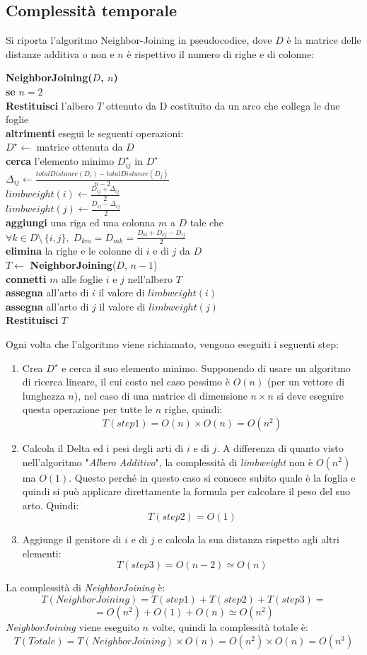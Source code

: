 \newpage
\subsection{Complessità temporale}
Si riporta l'algoritmo Neighbor-Joining in pseudocodice, dove $D$ è la matrice delle distanze additiva o non e $n$ è rispettivo il numero di righe e di colonne:
\begin{framed}\noindent
  \textbf{NeighborJoining($D$, $n$)}\\
  \textbf{se} $n=2$\\
  \indent \textbf{Restituisci} l'albero $T$ ottenuto da D costituito da un arco che collega le due foglie\\
  \textbf{altrimenti} esegui le seguenti operazioni: \\
  $D^\star \leftarrow $ matrice ottenuta da $D$\\
  \textbf{cerca} l'elemento minimo $D^\star_{ij}$ in $D^\star$\\
  $\Delta_{ij} \leftarrow \frac{totalDistance(D_i)-totalDistance(D_j)}{n-2}$\\
  $ limbweight(i) \leftarrow \frac{D_{ij}+\Delta_{ij}}{2}  $ \\
  $ limbweight(j) \leftarrow \frac{D_{ij}-\Delta_{ij}}{2}  $ \\
  \textbf{aggiungi} una riga ed una colonna $m$ a $D$  tale che $\forall k\in D\setminus \, \{i,j\}, \; D_{km}=D_{mk}=\frac{D_{ki}+D_{kj}-D_{ij}}{2}$\\
  \textbf{elimina} la righe e le colonne di $i$ e di $j$ da $D$\\
  $T \leftarrow$ \textbf{NeighborJoining}($D$, $n-1$) \\
  \textbf{connetti} $m$ alle foglie $i$ e $j$ nell'albero $T$ \\
  \textbf{assegna} all'arto di $i$ il valore di $limbweight(i)$\\
  \textbf{assegna} all'arto di $j$ il valore di $limbweight(j)$\\
  \textbf{Restituisci} $T$
\end{framed}
Ogni volta che l'algoritmo viene richiamato, vengono eseguiti i seguenti step:
\begin{enumerate}
	\item Crea $D^\star$ e cerca il suo elemento minimo. Supponendo di usare un algoritmo di ricerca lineare, il cui costo nel caso pessimo è $O(n)$ (per un vettore di lunghezza $n$), nel caso di una matrice di dimensione $n \times n$ si deve eseguire questa operazione per tutte le $n$ righe, quindi:
	\[T(step1)=O(n) \times O(n)=O(n^2)\]
	\item Calcola il Delta ed i pesi degli arti di $i$ e di $j$. A differenza di quanto visto nell'algoritmo "\textit{Albero Additivo}", la complessità di \textit{limbweight} non è $O(n^2)$ ma $O(1)$. Questo perché in questo caso si conosce subito quale è la foglia e quindi si può applicare direttamente la formula per calcolare il peso del suo arto. Quindi:
	\[T(step2)=O(1)\]
	\item Aggiunge il genitore di $i$ e di $j$ e calcola la sua distanza rispetto agli altri elementi:
	\[T(step3)=O(n-2)\simeq O(n)\] 
\end{enumerate}
La complessità di \textit{NeighborJoining} è:
	\[T(NeighborJoining)=T(step1)+T(step2)+T(step3)=\]
	\[=O(n^2)+O(1)+O(n)\simeq O(n^2)\]
\textit{NeighborJoining} viene eseguito $n$ volte, quindi la complessità totale è:
\[T(Totale)=T(NeighborJoining) \times O(n) = O(n^2) \times O(n) = O(n^3) \]